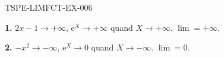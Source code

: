 \begin{corrige}{TSPE-LIMFCT-EX-006}


\textbf{1.} $2x-1 \to +\infty$, $\mathrm{e}^X \to +\infty$ quand $X \to +\infty$. $\boxed{\lim = +\infty}$.

\textbf{2.} $-x^2 \to -\infty$, $\mathrm{e}^X \to 0$ quand $X \to -\infty$. $\boxed{\lim = 0}$.

\end{corrige}

